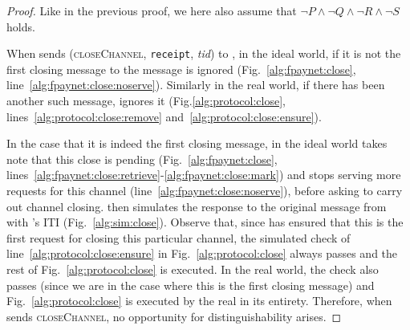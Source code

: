 \begin{proof}
  Like in the previous proof, we here also assume that $\neg P \wedge \neg Q
  \wedge \neg R \wedge \neg S$ holds.

  When \environment{} sends (\textsc{closeChannel}, \texttt{receipt},
  \textit{tid}) to \alice, in the ideal world, if it is not the first closing
  message to \alice{} the message is ignored (Fig.~\ref{alg:fpaynet:close},
  line~\ref{alg:fpaynet:close:noserve}). Similarly in the real world, if there
  has been another such message, \alice{} ignores it
  (Fig.\ref{alg:protocol:close}, lines~\ref{alg:protocol:close:remove}
  and~\ref{alg:protocol:close:ensure}).

  In the case that it is indeed the first closing message, in the ideal world
  \fpaynet{} takes note that this close is pending
  (Fig.~\ref{alg:fpaynet:close},
  lines~\ref{alg:fpaynet:close:retrieve}-\ref{alg:fpaynet:close:mark}) and stops
  serving more requests for this channel (line~\ref{alg:fpaynet:close:noserve}),
  before asking \simulator{} to carry out channel closing. \simulator{} then
  simulates the response to the original message from \environment{} with
  \alice's ITI (Fig.~\ref{alg:sim:close}). Observe that, since \fpaynet{} has
  ensured that this is the first request for closing this particular channel,
  the simulated check of line~\ref{alg:protocol:close:ensure} in
  Fig.~\ref{alg:protocol:close} always passes and the rest of
  Fig.~\ref{alg:protocol:close} is executed. In the real world, the check also
  passes (since we are in the case where this is the first closing message) and
  Fig.~\ref{alg:protocol:close} is executed by the real \alice{} in its
  entirety. Therefore, when \environment{} sends \textsc{closeChannel}, no
  opportunity for distinguishability arises.


\end{proof}
